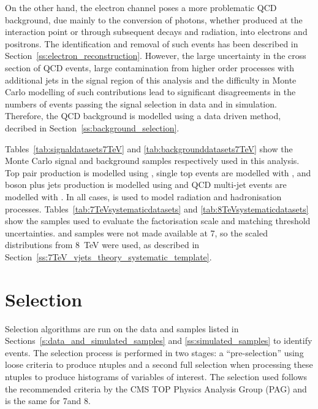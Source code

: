 On the other hand, the electron channel poses a more problematic QCD background, due mainly to the conversion
of photons, whether produced at the interaction point or through subsequent decays and radiation, into
electrons and positrons. The identification and removal of such events has been described in
Section~\ref{ss:electron_reconstruction}. However, the large uncertainty in the cross section of QCD events,
large contamination from higher order processes with additional jets in the signal region of this analysis and
the difficulty in Monte Carlo modelling of such contributions lead to significant disagreements in the numbers
of events passing the signal selection in data and in simulation. Therefore, the QCD background is
modelled using a data driven method, decribed in Section~\ref{ss:background_selection}.

Tables~\ref{tab:signaldatasets7TeV} and \ref{tab:backgrounddatasets7TeV} show the Monte Carlo signal and
background samples respectively used in this analysis. Top pair production is modelled using \MADGRAPH, single
top events are modelled with \POWHEG, \W and \Z boson plus jets production is modelled using \MADGRAPH and QCD
multi-jet events are modelled with \PYTHIA. In all cases, \PYTHIA is used to model radiation and hadronisation
processes. Tables~\ref{tab:7TeVsystematicdatasets} and \ref{tab:8TeVsystematicdatasets} show the samples used
to evaluate the factorisation scale and matching threshold uncertainties. \WpJets and \ZpJets samples were not
made available at 7\TeV, so the scaled distributions from \SI{8}{\TeV} were used, as described in
Section~\ref{ss:7TeV_vjets_theory_systematic_template}.








\section{Selection}
\label{s:selection}
Selection algorithms are run on the data and samples listed in Sections~\ref{s:data_and_simulated_samples} and
\ref{ss:simulated_samples} to identify \ttbar events. The selection process is performed in two stages: a
``pre-selection'' using loose criteria to produce ntuples and a second full selection when processing these
ntuples to produce histograms of variables of interest. The selection used follows the recommended criteria by
the CMS TOP Physics Analysis Group (PAG) and is the same for 7\TeV and 8\TeV.


